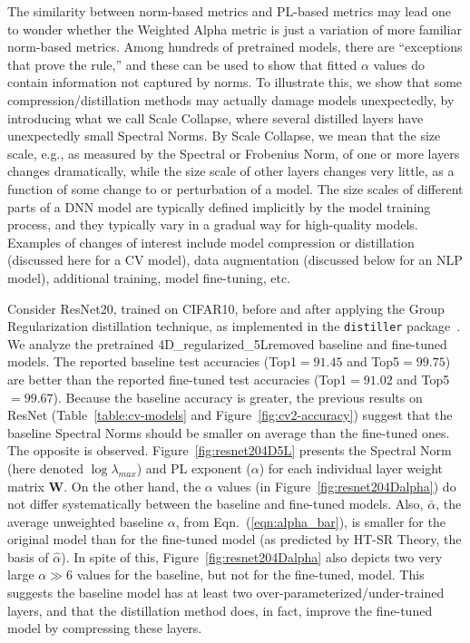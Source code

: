 The similarity between norm-based metrics and PL-based metrics may lead one to wonder whether the Weighted Alpha metric is just a variation of more familiar norm-based metrics.  
Among hundreds of pretrained models, there are ``exceptions that prove the rule,'' and these can be used to show that fitted $\alpha$ values do contain information not captured by norms. 
To illustrate this, we show that some compression/distillation methods \cite{CWZZ17_TR} may actually damage models unexpectedly, by introducing what we call Scale Collapse, where several distilled layers have unexpectedly small Spectral Norms.
%
By Scale Collapse, we mean that the size scale, e.g., as measured by the Spectral or Frobenius Norm, of one or more layers changes dramatically, while the size scale of other layers changes very little, as a function of some change to or perturbation of a model.
The size scales of different parts of a DNN model are typically defined implicitly by the model training process, and they typically vary in a gradual way for high-quality models.
Examples of changes of interest include model compression or distillation (discussed here for a CV model), data augmentation (discussed below for an NLP model), additional training, model fine-tuning, etc.

Consider ResNet20, trained on CIFAR10, before and after applying the Group Regularization distillation technique, as implemented in the \texttt{distiller} package~\cite{distiller}.
We analyze the pretrained 4D\_regularized\_5Lremoved baseline and fine-tuned models. 
The reported baseline test accuracies (Top1$=91.45$ and Top5$=99.75$) are better than the reported fine-tuned test accuracies (Top1$=91.02$ and Top5$=99.67$).  
Because the baseline accuracy is greater,  the previous results on ResNet (Table~\ref{table:cv-models} and Figure~\ref{fig:cv2-accuracy}) suggest that the baseline Spectral Norms should be smaller on average than the fine-tuned ones.
The opposite is observed.
Figure~\ref{fig:resnet204D5L} presents the Spectral Norm (here denoted $\log\lambda_{max}$) and PL exponent ($\alpha$) for each individual layer weight matrix $\mathbf{W}$.
On the other hand, the $\alpha$ values (in Figure~\ref{fig:resnet204Dalpha}) do not differ systematically between the baseline and fine-tuned models.
Also, $\bar{\alpha}$, the average unweighted baseline $\alpha$, 
from Eqn.~(\ref{eqn:alpha_bar}),
is smaller for the original model than for the fine-tuned model 
(as predicted by HT-SR Theory, the basis of $\hat{\alpha}$).
%
In spite of this, Figure~\ref{fig:resnet204Dalpha} also depicts two very large $\alpha\gg 6$ values for the baseline, but not for the fine-tuned, model.
This suggests the baseline model has at least two over-parameterized/under-trained layers, and that the distillation method does, in fact, improve the fine-tuned model by compressing these layers.

